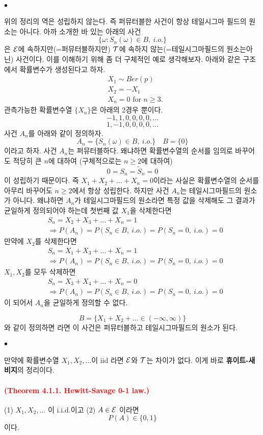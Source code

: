 \documentclass[12pt,oneside,english]{book}
\def\ck{\paragraph{\Large$\bullet$}\Large}
\newcommand{\parared}[1]{\paragraph{\Large\textcolor{red}{(#1)}}\Large}
\begin{document}
\ck 위의 정리의 역은 성립하지 않는다. 즉 퍼뮤터블한 사건이 항상 테일시그마 필드의 원소는 아니다. 아까 소개한 바 있는 아래의 사건
\[
\{\omega:S_n(\omega) \in B, ~i.o.\}
\]
은 ${\cal E}$에 속하지만(=퍼뮤터블하지만) ${\cal T}$에 속하지 않는(=테일시그마필드의 원소는아닌) 사건이다. 이를 이해하기 위해 좀 더 구체적인 예로 생각해보자. 아래와 같은 구조에서 확률변수가 생성된다고 하자. 
\begin{align*}
& X_1 \sim Ber(p) \\ 
& X_2 = -X_1  \\ 
& X_n = 0 \mbox{ for } n\geq 3.
\end{align*}
관측가능한 확률변수열 $\{X_n\}$은 아래의 2경우 뿐이다. 
\[
-1,1,0,0,0,0,\dots
\] 
\[
1,-1,0,0,0,0,\dots
\] 
사건 $A_n$를 아래와 같이 정의하자. 
\[
A_n=\{S_n(\omega) \in B, ~ i.o.\} \quad B=\{0\}
\] 
이라고 하자. 사건 $A_n$는 퍼뮤터블하다. 왜냐하면 확률변수열의 순서를 임의로 바꾸어도 적당히 큰 $n$에 대하여 (구체적으로는 $n\geq 2$에 대하여) 
\[
0=S_n=\tilde{S}_n=0
\]
이 성립하기 때문이다. 즉 $X_1+X_2+\dots+X_n=0$이라는 사실은 확률변수열의 순서를 아무리 바꾸어도 $n\geq 2$에서 항상 성립한다. 하지만 사건 $A_n$는 테일시그마필드의 원소가 아니다. 왜냐하면 $A_n$가 테일시그마필드의 원소라면 특정 값을 삭제해도 그 결과가 균일하게 정의되어야 하는데 첫번째 값 $X_1$을 삭제한다면 
\begin{align*}
& S_n=X_2+X_3+\dots+X_n=1 \\
& \Longrightarrow P(A_n)=P(S_n \in B,~i.o.)=P(S_n=0, ~i.o.)=0
\end{align*}
만약에 $X_2$를 삭제한다면 
\begin{align*}
& S_n=X_1+X_3+\dots+X_n=1 \\
& \Longrightarrow P(A_n)=P(S_n \in B,~i.o.)=P(S_n=0, ~i.o.)=0
\end{align*}
$X_1,X_2$를 모두 삭제하면 
\begin{align*}
& S_n=X_3+X_4+\dots+X_n=0 \\
& \Longrightarrow P(A_n)=P(S_n \in B,~i.o.)=P(S_n=0, ~i.o.)=0
\end{align*}
이 되어서 $A_n$을 균일하게 정의할 수 없다. 



\[
B=\{X_1+X_2+\dots \in (-\infty, \infty) \}
\]
와 같이 정의하면 라면 이 사건은 퍼뮤터블하고 테일시그마필드의 원소가 된다. 

\ck 만약에 확률변수열 $X_1,X_2,\dots$이 iid 라면 ${\cal E}$와 ${\cal T}$는 차이가 없다. 이게 바로 \textbf{휴이트-새비지}의 정리이다. 

\parared{Theorem 4.1.1. Hewitt-Savage 0-1 law.} 
(1) $X_1,X_2,\dots$ 이 i.i.d.이고 (2) $A \in {\cal E}$ 이라면 
\[
P(A) \in \{0,1\}
\]
이다. 
\end{document}

